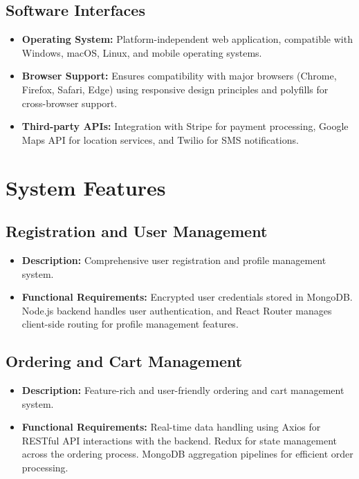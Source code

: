 \documentclass{article}
\begin{document}
\subsection{Software Interfaces}
\begin{itemize}
    \item \textbf{Operating System:} Platform-independent web application, compatible with Windows, macOS, Linux, and mobile operating systems.
    \item \textbf{Browser Support:} Ensures compatibility with major browsers (Chrome, Firefox, Safari, Edge) using responsive design principles and polyfills for cross-browser support.
    \item \textbf{Third-party APIs:} Integration with Stripe for payment processing, Google Maps API for location services, and Twilio for SMS notifications.
\end{itemize}

\newpage
\section{System Features}
\subsection{Registration and User Management}
\begin{itemize}
    \item \textbf{Description:} Comprehensive user registration and profile management system.
    \item \textbf{Functional Requirements:} Encrypted user credentials stored in MongoDB. Node.js backend handles user authentication, and React Router manages client-side routing for profile management features.
\end{itemize}

\subsection{Ordering and Cart Management}
\begin{itemize}
    \item \textbf{Description:} Feature-rich and user-friendly ordering and cart management system.
    \item \textbf{Functional Requirements:} Real-time data handling using Axios for RESTful API interactions with the backend. Redux for state management across the ordering process. MongoDB aggregation pipelines for efficient order processing.
\end{itemize}
\end{document}
